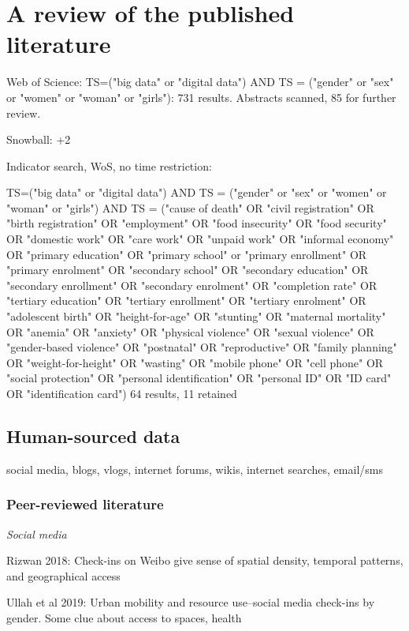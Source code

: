 \documentclass{article}
\begin{document}
\section{A review of the published literature}

Web of Science:
TS=("big data" or "digital data")  AND TS = ("gender" or "sex" or "women" or "woman" or "girls"): 731 results.
Abstracts scanned, 85 for further review.

Snowball: +2



Indicator search, WoS, no time restriction:

TS=("big data" or "digital data")  AND TS = ("gender" or "sex" or "women" or "woman" or "girls") AND TS = ("cause of death" OR "civil registration" OR "birth registration" OR "employment" OR "food insecurity" OR "food security" OR "domestic work" OR "care work" OR "unpaid work" OR "informal economy" OR  "primary education" OR "primary school"  or "primary enrollment" OR "primary enrolment" OR "secondary school" OR "secondary education" OR "secondary enrollment" OR "secondary enrolment" OR "completion rate" OR "tertiary education" OR "tertiary enrollment" OR "tertiary enrolment" OR "adolescent birth" OR "height-for-age" OR "stunting" OR "maternal mortality" OR "anemia" OR "anxiety" OR "physical violence" OR "sexual violence" OR "gender-based violence" OR "postnatal" OR "reproductive" OR "family planning" OR "weight-for-height" OR "wasting" OR "mobile phone" OR "cell phone" OR "social protection" OR "personal identification" OR "personal ID" OR "ID card" OR "identification card")
64 results, 11 retained


\subsection{Human-sourced data}

social media, blogs, vlogs, internet forums, wikis, internet searches, email/sms

\subsubsection{Peer-reviewed literature}


\textit{Social media}


Rizwan 2018: Check-ins on Weibo give sense of spatial density, temporal patterns, and geographical access 

Ullah et al 2019: Urban mobility and resource use--social media check-ins by gender. Some clue about access to spaces, health
\end{document}
